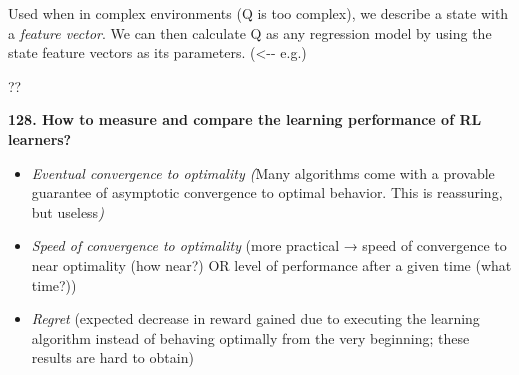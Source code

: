 Used when in complex environments (Q is too complex), we describe a
state with a \textit{feature vector}. We can then calculate Q as any
regression model by using the state feature vectors as its parameters.
(\textless-\/- e.g.)

??

\textbf{128. How to measure and compare the learning performance of RL
learners?}

\begin{itemize}
\item \textit{Eventual convergence to optimality (}Many algorithms come
  with a provable guarantee of asymptotic convergence to optimal
  behavior. This is reassuring, but useless\textit{)}
\item \textit{Speed of convergence to optimality} (more practical → speed
  of convergence to near optimality (how near?) OR level of performance
  after a given time (what time?))
\item \textit{Regret} (expected decrease in reward gained due to
  executing the learning algorithm instead of behaving optimally from
  the very beginning; these results are hard to obtain)
\end{itemize}
